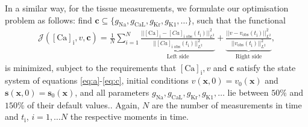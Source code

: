 \documentclass{article}
\begin{document}
In a similar way, for the tissue measurements, we formulate our optimisation problem as follows: find $\boldsymbol{c} \subseteq\{ g_{\mathrm{Na}}, g_{\mathrm{CaL}}, g_{\mathrm{Kr}}, g_{\mathrm{K1}}, \ldots \}$, such that the functional
\begin{eqnarray} 
\mathcal{J}([\mathrm{Ca}]_{\mathrm{i}}, v, \boldsymbol{c}) = \frac{1}{N} \sum_{i=1}^{N} \underbrace{\frac{||[\mathrm{Ca}]_{\mathrm{i}}-[Ca]_{\text{i obs}}(t_{\mathrm{i}}) ||^2_{L^2}}{||[Ca]_{\text{i obs}}(t_{\mathrm{i}}) ||^2_{L^2}}}_{\text{Left side}} +  \underbrace{\frac{||v-v_{\text{obs}}(t_{\mathrm{i}})||^2_{L^2}}{||v_{\text{obs}}(t_{\mathrm{i}})||^2_{L^2}}}_{\text{Right side}},\label{J}
\end{eqnarray}
is minimized, subject to the requirements that $[\mathrm{Ca}]_{\mathrm{i}}, v$ and $\boldsymbol{c}$ satisfy the state system of equations \eqref{eq:a}-\eqref{eq:c}, initial conditions $v(\textbf{x},0)=v_0(\textbf{x})$ and $\mathbf{s}(\mathbf{x},0)=\mathbf{s}_0(\mathbf{x})$, and all parameters $g_{\mathrm{Na}}, g_{\mathrm{CaL}}, g_{\mathrm{Kr}}, g_{\mathrm{K1}}, \ldots$ lie between $50\%$ and $150\%$ of their default values.. Again, $N$ are the number of measurements in time and $t_{\mathrm{i}}$, $i=1, \dots N$ the respective moments in time. 
%
\end{document}
